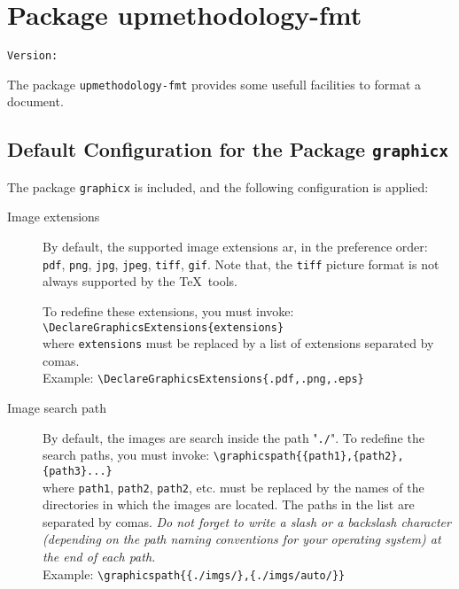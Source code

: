 \documentclass[book]{upmethodology-document}
\makeatletter
\let\VERfmt\upm@package@fmt@ver
\makeatother
\begin{document}

\chapter{Package upmethodology-fmt}

\begin{center}
	\texttt{Version: \VERfmt}
\end{center}

The package \texttt{upmethodology-fmt} provides some usefull facilities to format a document.

\section{Default Configuration for the Package \texttt{graphicx}}

The package \texttt{graphicx} is included, and the following configuration is applied:
\begin{description}
\item[Image extensions] By default, the supported image extensions ar, in the preference order: \texttt{pdf}, \texttt{png}, \texttt{jpg}, \texttt{jpeg}, \texttt{tiff}, \texttt{gif}. Note that, the \texttt{tiff} picture format is not always supported by the \TeX\ tools.

To redefine these extensions, you must invoke:\\
	\texttt{{\textbackslash}DeclareGraphicsExtensions\{extensions\}} \\
	where \texttt{extensions} must be replaced by a list of extensions separated by comas. \\
	Example: \texttt{{\textbackslash}DeclareGraphicsExtensions\{.pdf,.png,.eps\}} \\
\item[Image search path] By default, the images are search inside the path "\texttt{./}". To redefine the search paths, you must invoke:
	\texttt{{\textbackslash}graphicspath\{\{path1\},\{path2\},\{path3\}...\}} \\
	where \texttt{path1}, \texttt{path2}, \texttt{path2}, etc. must be replaced by the names of the directories in which the images are located. The paths in the list are separated by comas. \emph{Do not forget to write a slash or a backslash character (depending on the path naming conventions for your operating system) at the end of each path.} \\
	Example: \texttt{{\textbackslash}graphicspath\{\{./imgs/\},\{./imgs/auto/\}\}} \\
\end{description}
\end{document}
